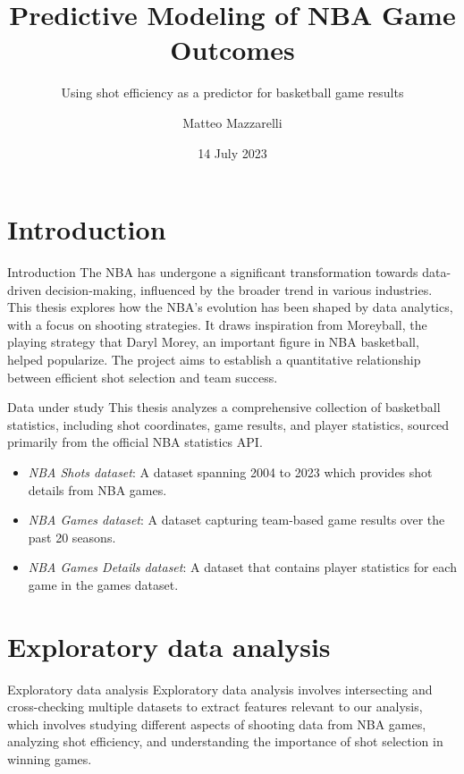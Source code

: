 \documentclass[
  ignorenonframetext,
]{beamer}
\title{Predictive Modeling of NBA Game Outcomes}
\subtitle{Using shot efficiency as a predictor for basketball game
results}
\author{Matteo Mazzarelli}
\date{14 July 2023}
\begin{document}
\frame{\titlepage}

\hypertarget{introduction}{%
\section{Introduction}\label{introduction}}

\begin{frame}{Introduction}
The NBA has undergone a significant transformation towards data-driven
decision-making, influenced by the broader trend in various industries.
This thesis explores how the NBA's evolution has been shaped by data
analytics, with a focus on shooting strategies. It draws inspiration
from Moreyball, the playing strategy that Daryl Morey, an important
figure in NBA basketball, helped popularize. The project aims to
establish a quantitative relationship between efficient shot selection
and team success.
\end{frame}

\begin{frame}{Data under study}
\protect\hypertarget{data-under-study}{}
This thesis analyzes a comprehensive collection of basketball
statistics, including shot coordinates, game results, and player
statistics, sourced primarily from the official NBA statistics API.

\begin{itemize}
\item
  \emph{NBA Shots dataset}: A dataset spanning 2004 to 2023 which
  provides shot details from NBA games.
\item
  \emph{NBA Games dataset}: A dataset capturing team-based game results
  over the past 20 seasons.
\item
  \emph{NBA Games Details dataset}: A dataset that contains player
  statistics for each game in the games dataset.
\end{itemize}
\end{frame}

\hypertarget{exploratory-data-analysis}{%
\section{Exploratory data analysis}\label{exploratory-data-analysis}}

\begin{frame}{Exploratory data analysis}
Exploratory data analysis involves intersecting and cross-checking
multiple datasets to extract features relevant to our analysis, which
involves studying different aspects of shooting data from NBA games,
analyzing shot efficiency, and understanding the importance of shot
selection in winning games.
\end{frame}
\end{document}
